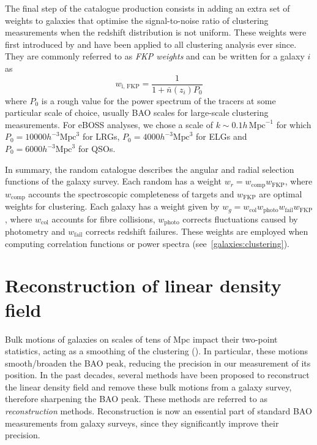 The final step of the catalogue production consists in adding an extra set of weights 
to galaxies that optimise the signal-to-noise ratio of clustering measurements 
when the redshift distribution is not uniform. These weights were first introduced 
by \cite{feldmanPowerSpectrumAnalysisThreedimensional1994} and have been applied 
to all clustering analysis ever since. They are commonly referred to as 
\emph{FKP weights} and can be written for a galaxy $i$ as
\begin{equation}
    w_\text{i, FKP} = \frac{1}{1 + \bar{n}(z_i)P_0}
\end{equation}
where $P_0$ is a rough value for the power spectrum of the tracers at some 
particular scale of choice, usually BAO scales for large-scale clustering measurements.
For eBOSS analyses, we chose a scale of $k \sim 0.1 h\, \text{Mpc}^{-1}$ for which 
$P_0 = 10000 h^{-3}\text{Mpc}^{3}$ for LRGs, 
$P_0 = 4000 h^{-3}\text{Mpc}^{3}$ for ELGs and 
$P_0 = 6000 h^{-3} \text{Mpc}^{3}$ for QSOs. 

In summary, the random catalogue describes the angular and radial selection functions
of the galaxy survey. 
Each random has a weight $w_r = w_\text{comp} w_\text{FKP}$, where $w_\text{comp}$ accounts
the spectroscopic completeness of targets and $w_\text{FKP}$ are optimal weights for clustering. 
Each galaxy has a weight given by $w_g = w_\text{col} w_\text{photo} w_\text{fail} w_\text{FKP}$,
where $w_\text{col}$ accounts for fibre collisions, $w_\text{photo}$ corrects fluctuations caused 
by photometry and $w_\text{fail}$ corrects redshift failures. 
These weights are employed when computing correlation functions 
or power spectra (see~\ref{galaxies:clustering}).

\section{Reconstruction of linear density field} 
\label{galaxies:reconstruction}

Bulk motions of galaxies on scales of tens of Mpc impact their two-point statistics, 
acting as a smoothing of the clustering (\cite{eisensteinRobustnessAcousticScale2007}).  
In particular, these motions smooth/broaden the BAO peak, 
reducing the precision in our measurement of its position. 
In the past decades, several methods have been proposed to reconstruct
the linear density field and remove these bulk motions from a galaxy survey,
therefore sharpening the BAO peak.
These methods are referred to as \emph{reconstruction} methods. 
Reconstruction is now an essential part of standard BAO measurements from galaxy surveys,
since they significantly improve their precision. 

